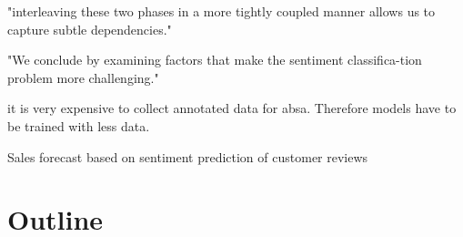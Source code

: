 "interleaving these two phases in a more tightly coupled manner allows us to capture subtle dependencies." \cite{Lakkaraju2014}


"We conclude by examining
factors that make the sentiment classifica-tion problem more challenging." \cite{Pang2012}

it is very expensive to collect annotated data for absa. Therefore models have to be trained with less data.

Sales forecast based on sentiment prediction of customer reviews \cite{Shen2015}

\section{Outline}
